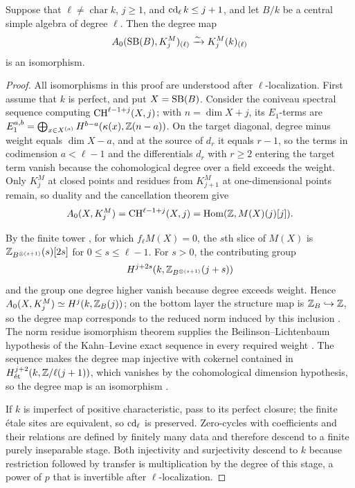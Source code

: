 \begin{lemma}
\label{lem:review-prime-degree-cycle}
Suppose that $\ell\ne\operatorname{char}k$, $j\ge1$, and $\operatorname{cd}_\ell k\le j+1$, and let $B/k$ be a central simple algebra of degree $\ell$.
Then the degree map
\[
 A_0(\operatorname{SB}(B),K_j^M)_{(\ell)}\xrightarrow{\sim}K_j^M(k)_{(\ell)}
\]
is an isomorphism.
\end{lemma}
\begin{proof}
All isomorphisms in this proof are understood after $\ell$-localization.
First assume that $k$ is perfect, and put $X=\operatorname{SB}(B)$.
Consider the coniveau spectral sequence computing $\operatorname{CH}^{\ell-1+j}(X,j)$; with $n=\dim X+j$, its $E_1$-terms are $E_1^{a,b}=\bigoplus_{x\in X^{(a)}}H^{b-a}(\kappa(x),\mathbb Z(n-a))$.
On the target diagonal, degree minus weight equals $\dim X-a$, and at the source of $d_r$ it equals $r-1$, so the terms in codimension $a<\ell-1$ and the differentials $d_r$ with $r\ge2$ entering the target term vanish because the cohomological degree over a field exceeds the weight.
Only $K_j^M$ at closed points and residues from $K_{j+1}^M$ at one-dimensional points remain, so duality \cite[Corollary C.7.3]{KahnLevine2010} and the cancellation theorem give
\[
 A_0(X,K_j^M)=\operatorname{CH}^{\ell-1+j}(X,j)
       =\operatorname{Hom}(\mathbb Z,M(X)(j)[j]).
\]

By the finite tower \cite[(8.1)]{KahnLevine2010}, for which $f_\ell M(X)=0$, the $s$th slice of $M(X)$ is $\mathbb Z_{B^{\otimes(s+1)}}(s)[2s]$ for $0\le s\le\ell-1$.
For $s>0$, the contributing group
\[
 H^{j+2s}(k,\mathbb Z_{B^{\otimes(s+1)}}(j+s))
\]
and the group one degree higher vanish because degree exceeds weight.
Hence $A_0(X,K_j^M)\simeq H^j(k,\mathbb Z_B(j))$; on the bottom layer the structure map is $\mathbb Z_B\hookrightarrow\mathbb Z$, so the degree map corresponds to the reduced norm induced by this inclusion \cite[Lemmas 5.4.2, 8.1.1(3), Theorems 6.5.3, 7.4.2]{KahnLevine2010}.
The norm residue isomorphism theorem supplies the Beilinson--Lichtenbaum hypothesis of the Kahn--Levine exact sequence in every required weight \cite{Voevodsky}.
The sequence makes the degree map injective with cokernel contained in $H^{j+2}_{\mathrm{\acute et}}(k,\mathbb Z/\ell(j+1))$, which vanishes by the cohomological dimension hypothesis, so the degree map is an isomorphism \cite[Theorem 8.2.2(2)]{KahnLevine2010}.

If $k$ is imperfect of positive characteristic, pass to its perfect closure; the finite \'etale sites are equivalent, so $\operatorname{cd}_\ell$ is preserved.
Zero-cycles with coefficients and their relations are defined by finitely many data and therefore descend to a finite purely inseparable stage.
Both injectivity and surjectivity descend to $k$ because restriction followed by transfer is multiplication by the degree of this stage, a power of $p$ that is invertible after $\ell$-localization.
\end{proof}

